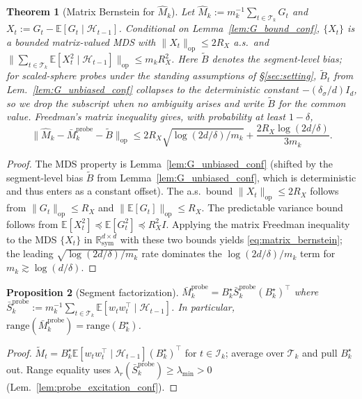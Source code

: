 \documentclass{article}
\newcommand{\R}{\mathbb{R}}
\newcommand{\E}{\mathbb{E}}
\newcommand{\op}{\mathrm{op}}
\newcommand{\cH}{\mathcal{H}}
\newcommand{\cT}{\mathcal{T}}
\newcommand{\cI}{\mathcal{I}}
\newcommand{\range}{\mathrm{range}}
\newtheorem{theorem}{Theorem}[section]
\newtheorem{proposition}[theorem]{Proposition}
\begin{document}
\begin{theorem}[Matrix Bernstein for $\widehat M_k$]
\label{thm:matrix_bernstein_conf}
Let $\widehat M_k := m_k^{-1}\sum_{t\in\cT_k} G_t$ and
$X_t := G_t - \E[G_t\mid\cH_{t-1}]$. Conditional on
Lemma~\ref{lem:G_bound_conf}, $\{X_t\}$ is a bounded matrix-valued
MDS with $\|X_t\|_\op\le 2R_X$ a.s.\ and
$\|\sum_{t\in\cT_k}\E[X_t^2\mid\cH_{t-1}]\|_\op\le m_k R_X^2$.
Here $\widetilde B$ denotes the segment-level bias; for
scaled-sphere probes under the standing assumptions of
\S\ref{sec:setting}, $\widetilde B_t$ from
Lem.~\ref{lem:G_unbiased_conf} collapses to the deterministic
constant $-(\delta_\sigma/d)I_d$, so we drop the subscript when no
ambiguity arises and write $\widetilde B$ for the common value.
Freedman's matrix inequality \citep{tropp2011freedman} gives, with
probability at least $1-\delta$,
\begin{equation}
\|\widehat M_k - \bar M_k^{\mathrm{probe}} - \widetilde B\|_\op
\le 2R_X\sqrt{\log(2d/\delta)/m_k} + \frac{2R_X\log(2d/\delta)}{3m_k}.
\label{eq:matrix_bernstein}
\end{equation}
\end{theorem}
\begin{proof}
The MDS property is Lemma~\ref{lem:G_unbiased_conf} (shifted by the
segment-level bias $\widetilde B$ from
Lemma~\ref{lem:G_unbiased_conf}, which is deterministic and thus enters
as a constant offset). The a.s.\ bound $\|X_t\|_\op\le 2R_X$ follows
from $\|G_t\|_\op\le R_X$ and $\|\E[G_t]\|_\op\le R_X$. The predictable
variance bound follows from $\E[X_t^2]\preceq \E[G_t^2]\preceq R_X^2 I$.
Applying the matrix Freedman inequality to the MDS $\{X_t\}$ in
$\R^{d\times d}_{\mathrm{sym}}$ with these two bounds yields
\eqref{eq:matrix_bernstein}; the leading $\sqrt{\log(2d/\delta)/m_k}$
rate dominates the $\log(2d/\delta)/m_k$ term for $m_k\gtrsim\log(d/\delta)$.
\end{proof}

\begin{proposition}[Segment factorization]
\label{prop:segment_factorization_conf}
$\bar M_k^{\mathrm{probe}} = B_k^\star \bar S_k^{\mathrm{probe}} (B_k^\star)^\top$ where
$\bar S_k^{\mathrm{probe}} := m_k^{-1}\sum_{t\in\cT_k}\E[w_tw_t^\top\mid\cH_{t-1}]$.
In particular, $\range(\bar M_k^{\mathrm{probe}}) = \range(B_k^\star)$.
\end{proposition}
\begin{proof}
$\widetilde M_t = B_k^\star \E[w_tw_t^\top\mid\cH_{t-1}](B_k^\star)^\top$
for $t\in\cI_k$; average over $\cT_k$ and pull $B_k^\star$ out.
Range equality uses
$\lambda_r(\bar S_k^{\mathrm{probe}})\ge\lambda_{\min}>0$
(Lem.~\ref{lem:probe_excitation_conf}).
\end{proof}
\end{document}
